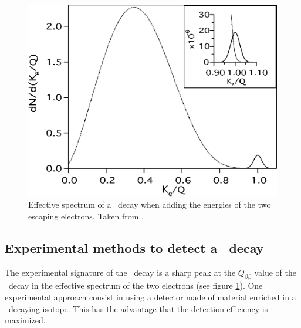 \documentclass[encoding=utf8,british]{tumphthesis}
\begin{document}
\begin{figure}[t!]
\begin{minipage}[t]{.475\textwidth}
		\includegraphics[width=\textwidth]{./Bilder/TheoretischesSpektrmdes0nubbDecay.png}
		\caption{Effective spectrum of a \twonu\ decay when adding the energies of the two escaping electrons.  Taken from \cite{elliott_double_2002}.}
		\label{fig:TheoSpektrum}
	\end{minipage}
\end{figure}

\subsection{Experimental methods to detect a \onbb\ decay}

The experimental signature of the \onbb\ decay is a sharp peak at the $Q_{\beta\beta}$ value of the \twonu\ decay in the effective spectrum of the two electrons (see figure \ref{fig:TheoSpektrum}).
One experimental approach consist in using a detector made of material enriched in a \onbb\ decaying isotope.
This has the advantage that the detection efficiency is maximized.
\\
\end{document}
